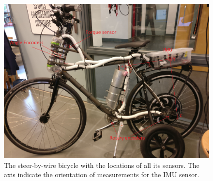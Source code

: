 \begin{figure}[ht]
    \centering
    \captionsetup{justification=centering,margin=2cm}

    \includegraphics[scale=0.08]{images/imu_axis_steerbywire.jpg}
    \caption{The steer-by-wire bicycle with the locations of all its sensors. The axis indicate the orientation of measurements for the IMU sensor.}
    \label{fig:IMUaxis}
\end{figure}


